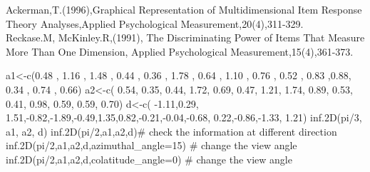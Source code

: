 \begin{References}\relax
Ackerman,T.(1996),Graphical Representation of Multidimensional Item Response Theory Analyses,Applied Psychological Measurement,20(4),311-329.\\
Reckase.M, McKinley.R,(1991), The Discriminating Power of Items That Measure More Than One Dimension, Applied Psychological Measurement,15(4),361-373.
\end{References}
\begin{Examples}
\begin{ExampleCode}
a1<-c(0.48 , 1.16 , 1.48 , 0.44 , 0.36 , 1.78 , 0.64 , 1.10 , 0.76 , 0.52 , 0.83 ,0.88, 0.34 , 0.74 , 0.66)
a2<-c( 0.54, 0.35, 0.44, 1.72, 0.69, 0.47, 1.21, 1.74, 0.89, 0.53, 0.41, 0.98, 0.59, 0.59, 0.70)
d<-c( -1.11,0.29, 1.51,-0.82,-1.89,-0.49,1.35,0.82,-0.21,-0.04,-0.68, 0.22,-0.86,-1.33, 1.21)
inf.2D(pi/3, a1, a2, d)
inf.2D(pi/2,a1,a2,d)# check the information at different direction
inf.2D(pi/2,a1,a2,d,azimuthal_angle=15) # change the view angle
inf.2D(pi/2,a1,a2,d,colatitude_angle=0) # change the view angle
\end{ExampleCode}
\end{Examples}

